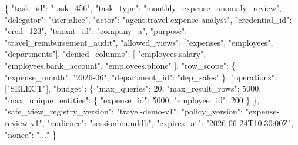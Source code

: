 \documentclass[10pt,twocolumn]{article}
\newenvironment{Shaded}{}{}
\newcommand{\DataTypeTok}[1]{\textcolor[rgb]{0.56,0.13,0.00}{#1}}
\newcommand{\DecValTok}[1]{\textcolor[rgb]{0.25,0.63,0.44}{#1}}
\newcommand{\FunctionTok}[1]{\textcolor[rgb]{0.02,0.16,0.49}{#1}}
\newcommand{\OtherTok}[1]{\textcolor[rgb]{0.00,0.44,0.13}{#1}}
\newcommand{\StringTok}[1]{\textcolor[rgb]{0.25,0.44,0.63}{#1}}
\begin{document}
\begin{Shaded}
\begin{Highlighting}[]
\FunctionTok{\{}
  \DataTypeTok{"task\_id"}\FunctionTok{:} \StringTok{"task\_456"}\FunctionTok{,}
  \DataTypeTok{"task\_type"}\FunctionTok{:} \StringTok{"monthly\_expense\_anomaly\_review"}\FunctionTok{,}
  \DataTypeTok{"delegator"}\FunctionTok{:} \StringTok{"user:alice"}\FunctionTok{,}
  \DataTypeTok{"actor"}\FunctionTok{:} \StringTok{"agent:travel{-}expense{-}analyst"}\FunctionTok{,}
  \DataTypeTok{"credential\_id"}\FunctionTok{:} \StringTok{"cred\_123"}\FunctionTok{,}
  \DataTypeTok{"tenant\_id"}\FunctionTok{:} \StringTok{"company\_a"}\FunctionTok{,}
  \DataTypeTok{"purpose"}\FunctionTok{:} \StringTok{"travel\_reimbursement\_audit"}\FunctionTok{,}
  \DataTypeTok{"allowed\_views"}\FunctionTok{:} \OtherTok{[}\StringTok{"expenses"}\OtherTok{,} \StringTok{"employees"}\OtherTok{,} \StringTok{"departments"}\OtherTok{]}\FunctionTok{,}
  \DataTypeTok{"denied\_columns"}\FunctionTok{:} \OtherTok{[}
    \StringTok{"employees.salary"}\OtherTok{,}
    \StringTok{"employees.bank\_account"}\OtherTok{,}
    \StringTok{"employees.phone"}
  \OtherTok{]}\FunctionTok{,}
  \DataTypeTok{"row\_scope"}\FunctionTok{:} \FunctionTok{\{}
    \DataTypeTok{"expense\_month"}\FunctionTok{:} \StringTok{"2026{-}06"}\FunctionTok{,}
    \DataTypeTok{"department\_id"}\FunctionTok{:} \StringTok{"dep\_sales"}
  \FunctionTok{\},}
  \DataTypeTok{"operations"}\FunctionTok{:} \OtherTok{[}\StringTok{"SELECT"}\OtherTok{]}\FunctionTok{,}
  \DataTypeTok{"budget"}\FunctionTok{:} \FunctionTok{\{}
    \DataTypeTok{"max\_queries"}\FunctionTok{:} \DecValTok{20}\FunctionTok{,}
    \DataTypeTok{"max\_result\_rows"}\FunctionTok{:} \DecValTok{5000}\FunctionTok{,}
    \DataTypeTok{"max\_unique\_entities"}\FunctionTok{:} \FunctionTok{\{}
      \DataTypeTok{"expense\_id"}\FunctionTok{:} \DecValTok{5000}\FunctionTok{,}
      \DataTypeTok{"employee\_id"}\FunctionTok{:} \DecValTok{200}
    \FunctionTok{\}}
  \FunctionTok{\},}
  \DataTypeTok{"safe\_view\_registry\_version"}\FunctionTok{:} \StringTok{"travel{-}demo{-}v1"}\FunctionTok{,}
  \DataTypeTok{"policy\_version"}\FunctionTok{:} \StringTok{"expense{-}review{-}v1"}\FunctionTok{,}
  \DataTypeTok{"audience"}\FunctionTok{:} \StringTok{"sessionbounddb"}\FunctionTok{,}
  \DataTypeTok{"expires\_at"}\FunctionTok{:} \StringTok{"2026{-}06{-}24T10:30:00Z"}\FunctionTok{,}
  \DataTypeTok{"nonce"}\FunctionTok{:} \StringTok{"..."}
\FunctionTok{\}}
\end{Highlighting}
\end{Shaded}
\end{document}

